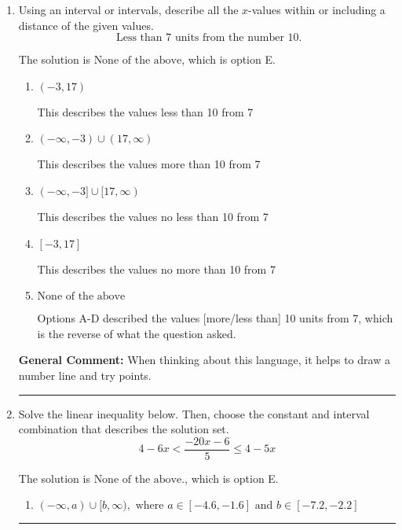 \documentclass{extbook}[14pt]
\newcommand{\litem}[1]{\item #1

\rule{\textwidth}{0.4pt}}
\begin{document}
\begin{enumerate}
{\begin{enumerate}[label=\Alph*.]
Corresponds to including the endpoints AND negating.
\item \( (-\infty, a) \cup (b, \infty), \text{ where } a \in [-11, -8] \text{ and } b \in [-5.33, 4.67] \)

 * Correct option.
\item \( (-\infty, \infty) \)

Corresponds to the variable canceling, which does not happen in this instance.
\end{enumerate}

\textbf{General Comment:} When multiplying or dividing by a negative, flip the sign.
}
\litem{
Using an interval or intervals, describe all the $x$-values within or including a distance of the given values.
\[ \text{ Less than } 7 \text{ units from the number } 10. \]

The solution is \( \text{None of the above} \), which is option E.\begin{enumerate}[label=\Alph*.]
\item \( (-3, 17) \)

This describes the values less than 10 from 7
\item \( (-\infty, -3) \cup (17, \infty) \)

This describes the values more than 10 from 7
\item \( (-\infty, -3] \cup [17, \infty) \)

This describes the values no less than 10 from 7
\item \( [-3, 17] \)

This describes the values no more than 10 from 7
\item \( \text{None of the above} \)

Options A-D described the values [more/less than] 10 units from 7, which is the reverse of what the question asked.
\end{enumerate}

\textbf{General Comment:} When thinking about this language, it helps to draw a number line and try points.
}
\litem{
Solve the linear inequality below. Then, choose the constant and interval combination that describes the solution set.
\[ 4 - 6 x < \frac{-20 x - 6}{5} \leq 4 - 5 x \]

The solution is \( \text{None of the above.} \), which is option E.\begin{enumerate}[label=\Alph*.]
\item \( (-\infty, a) \cup [b, \infty), \text{ where } a \in [-4.6, -1.6] \text{ and } b \in [-7.2, -2.2] \)


\end{enumerate}}
\end{enumerate}
\end{document}
